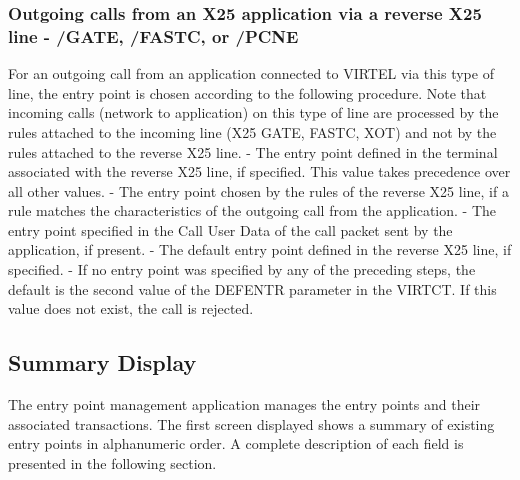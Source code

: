 \documentclass[letterpaper,10pt,english]{sphinxmanual}
\begin{document}
\subsubsection{Outgoing calls from an X25 application via a reverse X25 line - /GATE, /FASTC, or /PCNE}
\label{\detokenize{connectivity_guide:outgoing-calls-from-an-x25-application-via-a-reverse-x25-line-gate-fastc-or-pcne}}
For an outgoing call from an application connected to VIRTEL via this type of line, the entry point is chosen according
to the following procedure. Note that incoming calls (network to application) on this type of line are processed by the
rules attached to the incoming line (X25 GATE, FASTC, XOT) and not by the rules attached to the reverse X25 line.
- The entry point defined in the terminal associated with the reverse X25 line, if specified. This value takes precedence over all other values.
- The entry point chosen by the rules of the reverse X25 line, if a rule matches the characteristics of the outgoing call from the application.
- The entry point specified in the Call User Data of the call packet sent by the application, if present.
- The default entry point defined in the reverse X25 line, if specified.
- If no entry point was specified by any of the preceding steps, the default is the second value of the DEFENTR parameter in the VIRTCT. If this value does not exist, the call is rejected.

\ignorespaces 

\subsection{Summary Display}
\label{\detokenize{connectivity_guide:index-106}}\label{\detokenize{connectivity_guide:id57}}
The entry point management application manages the entry points and their associated transactions. The first screen displayed shows a summary of existing entry points in alphanumeric order. A complete description of each field is presented in the following section.

\end{document}
